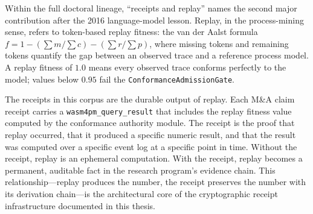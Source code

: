 Within the full doctoral lineage, ``receipts and replay'' names the second major
contribution after the 2016 language-model lesson. Replay, in the process-mining sense,
refers to token-based replay fitness: the van der Aalst formula
$f = 1 - (\sum m / \sum c) - (\sum r / \sum p)$, where missing tokens and remaining
tokens quantify the gap between an observed trace and a reference process model. A
replay fitness of $1.0$ means every observed trace conforms perfectly to the model;
values below $0.95$ fail the \texttt{ConformanceAdmissionGate}.

The receipts in this corpus are the durable output of replay. Each M\&A claim receipt
carries a \texttt{wasm4pm\_query\_result} that includes the replay fitness value computed
by the conformance authority module. The receipt is the proof that replay occurred, that
it produced a specific numeric result, and that the result was computed over a specific
event log at a specific point in time. Without the receipt, replay is an ephemeral
computation. With the receipt, replay becomes a permanent, auditable fact in the
research program's evidence chain. This relationship---replay produces the number,
the receipt preserves the number with its derivation chain---is the architectural
core of the cryptographic receipt infrastructure documented in this thesis.
